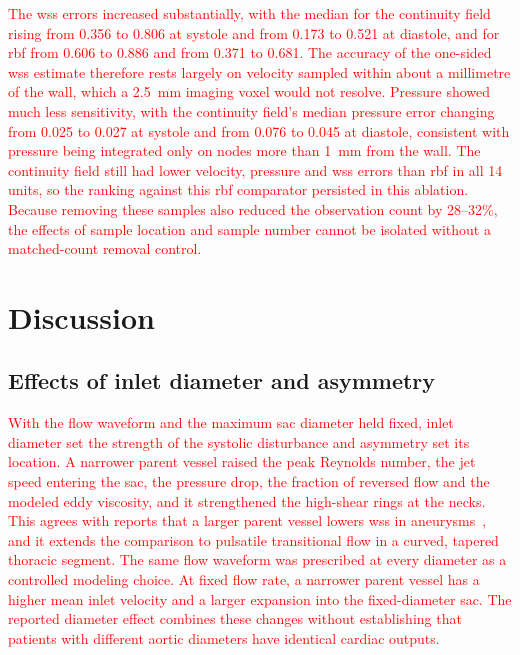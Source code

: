 \documentclass[12pt,a4paper]{article}
\newcommand{\WSS}{\ac{wss}\xspace}
\newcommand{\RBF}{\ac{rbf}\xspace}
\theoremstyle{definition}
\numberwithin{equation}{section}
\newcommand{\revision}[1]{\textcolor{red}{#1}}
\begin{document}
\revision{The \WSS errors increased substantially, with the median for the continuity field rising from 0.356 to 0.806 at systole and from 0.173 to 0.521 at diastole, and for \RBF from 0.606 to 0.886 and from 0.371 to 0.681. The accuracy of the one-sided \WSS estimate therefore rests largely on velocity sampled within about a millimetre of the wall, which a 2.5~mm imaging voxel would not resolve. Pressure showed much less sensitivity, with the continuity field's median pressure error changing from 0.025 to 0.027 at systole and from 0.076 to 0.045 at diastole, consistent with pressure being integrated only on nodes more than 1~mm from the wall. The continuity field still had lower velocity, pressure and \WSS errors than \RBF in all 14 units, so the ranking against this \RBF comparator persisted in this ablation. Because removing these samples also reduced the observation count by 28--32\%, the effects of sample location and sample number cannot be isolated without a matched-count removal control.}



\section{Discussion}
\label{sec:discussion}
\subsection{Effects of inlet diameter and asymmetry}
\revision{With the flow waveform and the maximum sac diameter held fixed, inlet diameter set the strength of the systolic disturbance and asymmetry set its location. A narrower parent vessel raised the peak Reynolds number, the jet speed entering the sac, the pressure drop, the fraction of reversed flow and the modeled eddy viscosity, and it strengthened the high-shear rings at the necks. This agrees with reports that a larger parent vessel lowers \WSS in aneurysms~\cite{fattahi2023influence}, and it extends the comparison to pulsatile transitional flow in a curved, tapered thoracic segment. The same flow waveform was prescribed at every diameter as a controlled modeling choice. At fixed flow rate, a narrower parent vessel has a higher mean inlet velocity and a larger expansion into the fixed-diameter sac. The reported diameter effect combines these changes without establishing that patients with different aortic diameters have identical cardiac outputs.}
\end{document}
